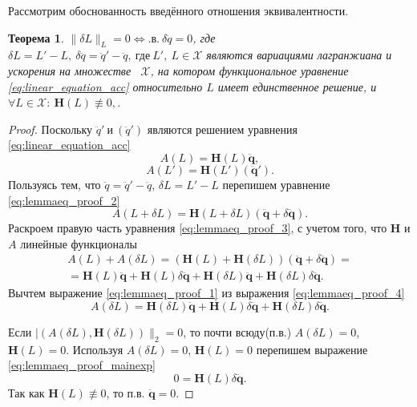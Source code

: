 \documentclass[a4paper, 12pt]{article}
\newtheorem{theorem}{Теорема}
\begin{document}
Рассмотрим обоснованность введённого отношения эквивалентности.
\begin{theorem} \label{lemmaeq}
$\|\delta L\|_L = 0 \Leftrightarrow \text{.в.}~\delta \ddot{q} = 0$, где $\delta L = L' - L, ~\delta \ddot{q} = \ddot{q}' - \ddot{q}, ~\text{где} \ L',\ L \in \mathcal {X}$ являются вариациями лагранжиана и ускорения на множестве ~$\mathcal {X}$, на котором функциональное уравнение \ref{eq:linear_equation_acc} относительно $L$ имеет единственное решение, и $\forall L\in \mathcal{X}:~\mathbf{H}(L) \not\equiv 0, $.
\end{theorem}
\begin{proof}
Поскольку $\ddot{q}' ~\text{и} ~(\ddot{q}')$ являются решением уравнения \ref{eq:linear_equation_acc} 
\begin{equation}
\label{eq:lemmaeq_proof_1}
A(L) = \mathbf{H}(L)\ddot{\mathbf{q}},
\end{equation}
\begin{equation}
\label{eq:lemmaeq_proof_2}
A(L') = \mathbf{H}(L')(\ddot{\mathbf{q}}').
\end{equation}
Пользуясь тем, что $\ddot{q} = \ddot{q}' - \ddot{q}$, $\delta L = L' - L$ перепишем уравнение \ref{eq:lemmaeq_proof_2}
\begin{equation}
\label{eq:lemmaeq_proof_3}
A(L+\delta L) = \mathbf{H}(L+\delta L)(\ddot{\mathbf{q}} + \delta \ddot{\mathbf{q}}).
\end{equation}
Раскроем правую часть уравнения \ref{eq:lemmaeq_proof_3}, с учетом того, что $\mathbf{H}$ и $A$ линейные функционалы
\begin{equation}
\label{eq:lemmaeq_proof_4}
\begin{split}
A(L)+A(\delta L) = (\mathbf{H}(L)+\mathbf{H}(\delta L))(\ddot{\mathbf{q}} + \delta \ddot{\mathbf{q}})=
\\
 = 
\mathbf{H}(L)\ddot{\mathbf{q}} + \mathbf{H}(L)\delta \ddot{\mathbf{q}} + \mathbf{H}(\delta L)\ddot{\mathbf{q}} + \mathbf{H}(\delta L)\delta \ddot{\mathbf{q}}.
\end{split}
\end{equation}
Вычтем выражение \ref{eq:lemmaeq_proof_1} из выражения \ref{eq:lemmaeq_proof_4}
\begin{equation}
\label{eq:lemmaeq_proof_mainexp}
A(\delta L) = \mathbf{H}(\delta L)\ddot{\mathbf{q}} + \mathbf{H}(L)\delta \ddot{\mathbf{q}} + \mathbf{H}(\delta L)\delta \ddot{\mathbf{q}}.
\end{equation}

Если $|(A(\delta L), \mathbf{H}(\delta L))\|_2 = 0$, то почти всюду(п.в.) $A(\delta L) = 0$, $\mathbf{H}(L) = 0$. Используя $A(\delta L) = 0$, $\mathbf{H}(L) = 0$ перепишем выражение
\ref{eq:lemmaeq_proof_mainexp}
\begin{equation}
\label{eq:lemmaeq_proof_5}
0 = \mathbf{H}(L)\delta \ddot{\mathbf{q}}.
\end{equation}
Так как $\mathbf{H}(L) \not\equiv0$, то п.в. $\ddot{\mathbf{q}} = 0$.


\end{proof}
\end{document}
